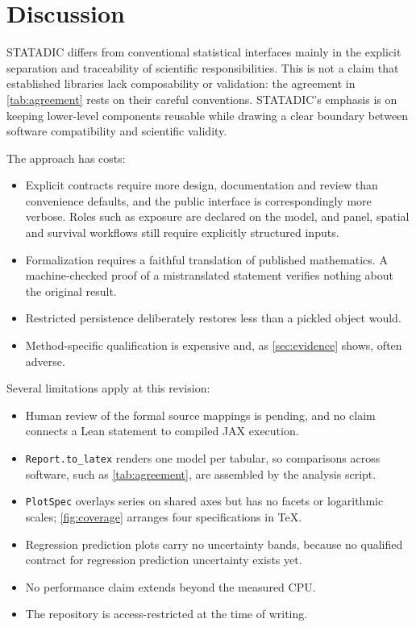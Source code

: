 \section{Discussion}\label{sec:discussion}

STATADIC differs from conventional statistical interfaces mainly in the explicit
separation and traceability of scientific responsibilities. This is not a claim
that established libraries lack composability or validation: the agreement in
\cref{tab:agreement} rests on their careful conventions. STATADIC's emphasis is on
keeping lower-level components reusable while drawing a clear boundary between
software compatibility and scientific validity.

The approach has costs:
\begin{itemize}
  \item Explicit contracts require more design, documentation and review than
    convenience defaults, and the public interface is correspondingly more
    verbose. Roles such as exposure are declared on the model, and panel,
    spatial and survival workflows still require explicitly structured
    inputs.
  \item Formalization requires a faithful translation of published mathematics.
    A machine-checked proof of a mistranslated statement verifies nothing about
    the original result.
  \item Restricted persistence deliberately restores less than a pickled object
    would.
  \item Method-specific qualification is expensive and, as
    \cref{sec:evidence} shows, often adverse.
\end{itemize}

Several limitations apply at this revision:
\begin{itemize}
  \item Human review of the formal source mappings is pending, and no claim
    connects a Lean statement to compiled JAX execution.
  \item \texttt{Report.to\_latex} renders one model per tabular, so
    comparisons across software, such as \cref{tab:agreement}, are assembled
    by the analysis script.
  \item \texttt{PlotSpec} overlays series on shared axes but has no facets or
    logarithmic scales; \cref{fig:coverage} arranges four specifications in
    TeX.
  \item Regression prediction plots carry no uncertainty bands, because no
    qualified contract for regression prediction uncertainty exists yet.
  \item No performance claim extends beyond the measured CPU.
  \item The repository is access-restricted at the time of writing.
\end{itemize}

